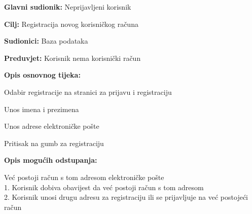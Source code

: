 					
					\noindent {}
					\begin{packed_item}
						\item \textbf{Glavni sudionik:} Neprijavljeni korisnik
						\item \textbf{Cilj:} Registracija novog korisničkog računa
						\item \textbf{Sudionici:} Baza podataka
						\item \textbf{Preduvjet:} Korisnik nema korisnički račun
						\item \textbf{Opis osnovnog tijeka:}
						\begin{packed_enum}
							\item Odabir registracije na stranici za prijavu i registraciju
							\item Unos imena i prezimena
							\item Unos adrese elektroničke pošte
							\item Pritisak na gumb za registraciju
						\end{packed_enum}
						\item \textbf{Opis mogućih odstupanja:}
						\begin{packed_item}
							\item[3.a] Već postoji račun s tom adresom elektroničke pošte
							\\1. Korisnik dobiva obavijest da već postoji račun s tom adresom
							\\2. Korisnik unosi drugu adresu za registraciju ili se prijavljuje na već postojeći račun
						\end{packed_item}
					\end{packed_item}
					

